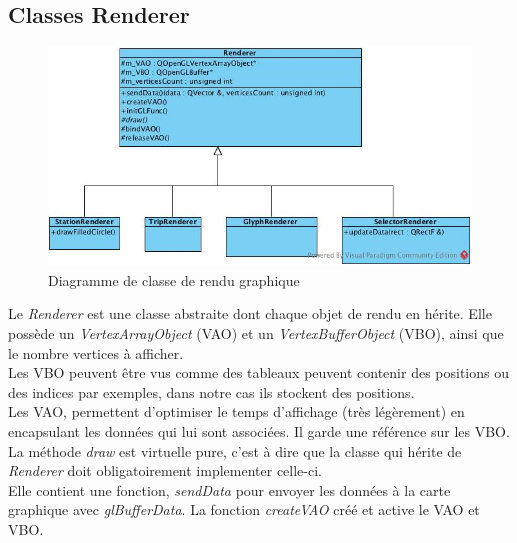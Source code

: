 \documentclass[12pt]{article}
\begin{document}
\clearpage
		\subsection{Classes Renderer}
		
		\begin{figure}[!h]
		\begin{center}
		\includegraphics[scale=.7]{dia_class_renderer.png}
		\caption{Diagramme de classe de rendu graphique}
		\label{fig:dia_class_renderer}
		\end{center}
		\end{figure}		
		
		Le \textit{Renderer} est une classe abstraite dont chaque objet de rendu en hérite. Elle possède
		un \textit{VertexArrayObject} (VAO) et un \textit{VertexBufferObject} (VBO), ainsi que le nombre vertices à afficher.\\
		
		Les VBO peuvent être vus comme des tableaux peuvent contenir des positions ou des indices par exemples, dans notre cas ils stockent des positions.\\

		Les VAO, permettent d’optimiser le temps d’affichage (très légèrement) en encapsulant les données qui lui sont associées. Il garde une référence sur les VBO.\\
		
		La méthode \textit{draw} est virtuelle pure, c’est à dire que la classe qui hérite de \textit{Renderer} doit obligatoirement implementer celle-ci.\\

		Elle contient une fonction, \textit{sendData} pour envoyer les données à la carte graphique avec \textit{glBufferData}. La fonction \textit{createVAO} créé et active le VAO et VBO.\\		
		
\end{document}
